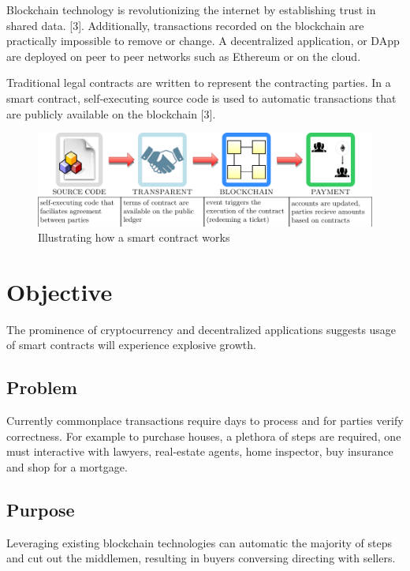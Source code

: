 \documentclass[12pt]{scrreprt}
\begin{document}
\begin{appendices}
Blockchain technology is revolutionizing the internet by establishing trust in shared data. [3].
	Additionally, transactions recorded on the blockchain are practically impossible to remove or change. 
	A decentralized application, or DApp are deployed on peer to peer networks such as Ethereum or on the cloud.
	
	
Traditional legal contracts are written to represent the contracting parties. In a smart contract, self-executing source code is used to automatic transactions that are publicly available on the blockchain [3].

\begin{figure}[ht]
		\centering
		\includegraphics[width=1\linewidth]{smartContractsExp.pdf}
		\caption{Illustrating how a smart contract works}
		\label{fig:smartContracts}
\end{figure}

\newpage 

\section{Objective}
The prominence of cryptocurrency and decentralized applications suggests usage of smart contracts will experience explosive growth.

\subsection{Problem}

Currently commonplace transactions require days to process and for parties verify correctness. For example to purchase houses, a plethora of steps are required, one must interactive with lawyers, real-estate agents, home inspector, buy insurance and shop for a mortgage. 

\subsection{Purpose}
Leveraging existing blockchain technologies can automatic the majority of steps and cut out the middlemen, resulting in buyers conversing directing with sellers.

\end{appendices}
\end{document}
